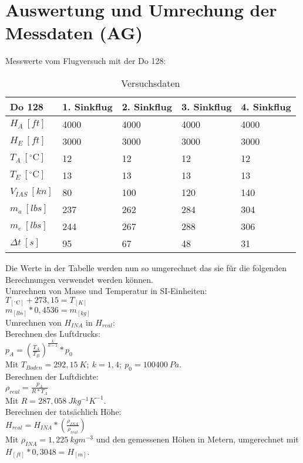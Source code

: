 \chapter{Auswertung und Umrechung der Messdaten (AG)}
\label{c:Auswertung}

Messwerte vom Flugversuch mit der Do 128: 

\begin{table}[h]
	\centering
	\begin{tabular}{| l | l | l | l | l | }
\hline
	Do 128 & 1. Sinkflug & 2. Sinkflug & 3. Sinkflug & 4. Sinkflug \\ \hline
	$H_A\ [ft]$ & 4000 & 4000 & 4000 & 4000 \\ \hline
	$H_E\ [ft]$  & 3000 & 3000 & 3000 & 3000 \\ \hline
	$T_A\ [^\circ\text{C}]$  & 12 & 12 & 12 & 12 \\ \hline
	$T_E\ [^\circ\text{C}]$  & 13 & 13 & 13 & 13 \\ \hline
	$V_{IAS}\ [kn]$ & 80 & 100 & 120 & 140 \\ \hline
	$m_a\ [lbs]$ & 237 & 262 & 284 & 304 \\ \hline
	$m_e\ [lbs]$ & 244 & 267 & 288 & 306 \\ \hline
	$\Delta t\ [s]$ & 95 & 67 & 48 & 31 \\ \hline
\end{tabular}
	\caption{Versuchsdaten}
	\label{tab:VersuchDaten2}
\end{table}
Die Werte in der Tabelle werden nun so umgerechnet das sie für die folgenden Berechnungen verwendet werden können.\\
Umrechnen von Masse und Temperatur in SI-Einheiten:\\


$T_{[^\circ\text{C}]}+273,15=T_{[K]}$\\
$m_{[lbs]}*0,4536=m_{[kg]}$\\

Umrechnen von $H_{INA}$ in $H_{real}$:\\
Berechnen des Luftdrucks:\\
$p_A=(\frac{T_A}{T_B})^ {\frac{k}{k-1}}*p_0$\\
Mit $T_{Boden}=292,15\ K;\ k=1,4;\ p_0=100400\ Pa$.\\
Berechnen der Luftdichte:\\
$\rho_{real}=\frac{p_A}{R*T_A}$\\
Mit $R=287,058\ Jkg^{-1}K^{-1}$.\\
Berechnen der tatsächlich Höhe:\\
$H_{real}=H_{INA}*\left(\frac{\rho _{INA}}{\rho _{real}}\right) $\\
Mit $\rho_{INA}=1,225\ kgm^{-3}$ und den gemessenen Höhen in Metern, umgerechnet mit
$H_{[ft]}*0,3048=H_{[m]} $.\\

